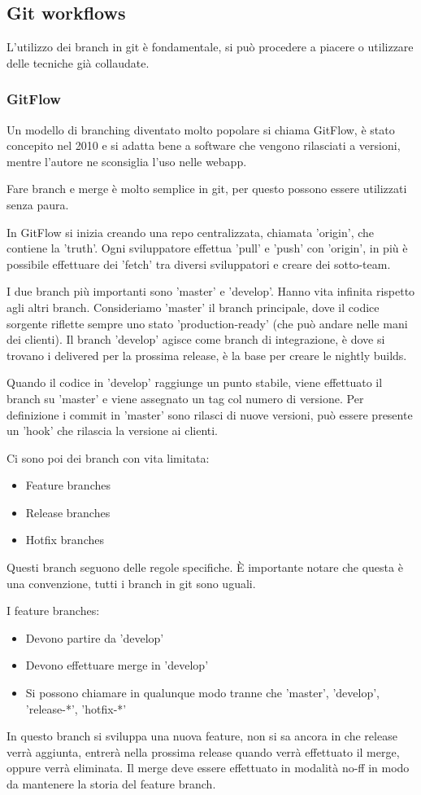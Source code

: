 \documentclass[a4paper,12pt,titlepage,oneside]{book}
\begin{document}
\subsection{Git workflows}
L'utilizzo dei branch in git è fondamentale, si può procedere a piacere o utilizzare delle tecniche già collaudate.

\subsubsection{GitFlow}
Un modello di branching diventato molto popolare si chiama GitFlow, è stato concepito nel 2010 e si adatta bene a software che vengono rilasciati a versioni, mentre l'autore ne sconsiglia l'uso nelle webapp.

Fare branch e merge è molto semplice in git, per questo possono essere utilizzati senza paura.

In GitFlow si inizia creando una repo centralizzata, chiamata 'origin', che contiene la 'truth'. Ogni sviluppatore effettua 'pull' e 'push' con 'origin', in più è possibile effettuare dei 'fetch' 
tra diversi sviluppatori e creare dei sotto-team.

I due branch più importanti sono 'master' e 'develop'. Hanno vita infinita rispetto agli altri branch. Consideriamo 'master' il branch principale, dove il codice sorgente riflette sempre uno stato 'production-ready' 
(che può andare nelle mani dei clienti). Il branch 'develop' agisce come branch di integrazione, è dove si trovano i delivered per la prossima release, è la base per creare le nightly builds.

Quando il codice in 'develop' raggiunge un punto stabile, viene effettuato il branch su 'master' e viene assegnato un tag col numero di versione. Per definizione i commit in 'master' sono rilasci di nuove versioni, 
può essere presente un 'hook' che rilascia la versione ai clienti.

Ci sono poi dei branch con vita limitata:
\begin{itemize}
    \item Feature branches
    \item Release branches
    \item Hotfix branches
\end{itemize}
Questi branch seguono delle regole specifiche. È importante notare che questa è una convenzione, tutti i branch in git sono uguali.

I feature branches:
\begin{itemize}
    \item Devono partire da 'develop'
    \item Devono effettuare merge in 'develop'
    \item Si possono chiamare in qualunque modo tranne che 'master', 'develop', 'release-*', 'hotfix-*'
\end{itemize}
In questo branch si sviluppa una nuova feature, non si sa ancora in che release verrà aggiunta, entrerà nella prossima release quando verrà effettuato il merge, oppure verrà eliminata. 
Il merge deve essere effettuato in modalità no-ff in modo da mantenere la storia del feature branch.
\end{document}
